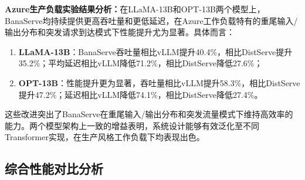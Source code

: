 \textbf{Azure生产负载实验结果分析：}在LLaMA-13B和OPT-13B两个模型上，BanaServe均持续提供更高吞吐量和更低延迟，在Azure工作负载特有的重尾输入/输出分布和突发请求到达模式下性能提升尤为显著。具体而言：

\begin{enumerate}
    \item \textbf{LLaMA-13B}：BanaServe吞吐量相比vLLM提升40.4\%，相比DistServe提升35.2\%；平均延迟相比vLLM降低71.2\%，相比DistServe降低27.6\%；
    \item \textbf{OPT-13B}：性能提升更为显著，吞吐量相比vLLM提升58.3\%，相比DistServe提升47.2\%；延迟相比vLLM降低74.1\%，相比DistServe降低27.4\%。
\end{enumerate}

这些改进突出了BanaServe在重尾输入/输出分布和突发流量模式下维持高效率的能力。两个模型架构上一致的增益表明，系统设计能够有效泛化至不同Transformer实现，在生产风格工作负载下均表现出色。

\subsection{综合性能对比分析}



